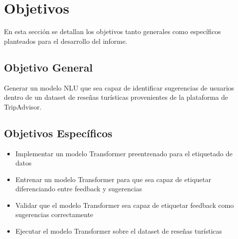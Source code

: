 \chapter{Objetivos}
\label{cha:objetivos}

En esta sección se detallan los objetivos tanto generales como específicos planteados para el desarrollo del informe.

\section{Objetivo General}
\label{sec:objetivo_general}
Generar un modelo NLU que sea capaz de identificar sugerencias de usuarios dentro de un dataset de reseñas turísticas provenientes de la plataforma de TripAdvisor.

\section{Objetivos Específicos}
\label{sec:objetivos_especificos}

\begin{itemize}


    \item Implementar un modelo Transformer preentrenado para el etiquetado de datos 

    \item Entrenar un modelo Transformer para que sea capaz de etiquetar diferenciando entre feedback y sugerencias

    \item Validar que el modelo Transformer sea capaz de etiquetar feedback como sugerencias correctamente

    \item Ejecutar el modelo Transformer sobre el dataset de reseñas turísticas


\end{itemize}

